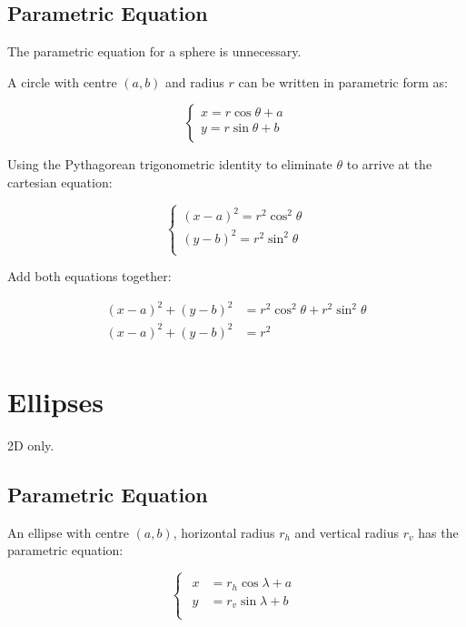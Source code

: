 \documentclass[a4paper,11pt]{article}
\begin{document}
\subsection{Parametric Equation}

The parametric equation for a sphere is unnecessary.

A circle with centre $(a, b)$ and radius $r$ can be written in parametric form
as:

$$
\begin{cases}
x = r \cos{\theta} + a \\
y = r \sin{\theta} + b \\
\end{cases}
$$

Using the Pythagorean trigonometric identity to eliminate $\theta$ to arrive at
the cartesian equation:

$$
\begin{cases}
(x - a)^2 = r^2 \cos^2{\theta} \\
(y - b)^2 = r^2 \sin^2{\theta} \\
\end{cases}
$$

Add both equations together:

$$
\begin{aligned}
(x - a)^2 + (y - b)^2 & = r^2 \cos^2{\theta} + r^2 \sin^2{\theta} \\
(x - a)^2 + (y - b)^2 & = r^2 \\
\end{aligned}
$$




\section{Ellipses}

2D only.


\subsection{Parametric Equation}

An ellipse with centre $(a, b)$, horizontal radius $r_h$ and vertical radius
$r_v$ has the parametric equation:

$$
\begin{cases}
\begin{aligned}
x & = r_h \cos{\lambda} + a \\
y & = r_v \sin{\lambda} + b \\
\end{aligned}
\end{cases}
$$
\end{document}
